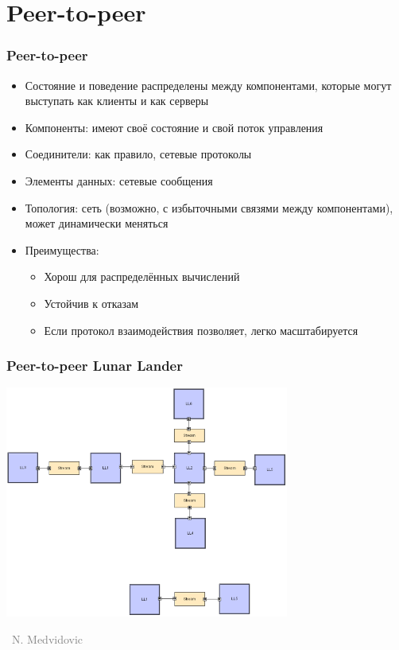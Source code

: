 \documentclass[xetex,mathserif,serif]{beamer}
\newcommand{\attribution}[1] {
	\vspace{-5mm}\begin{flushright}\begin{scriptsize}\textcolor{gray}{\textcopyright\, #1}\end{scriptsize}\end{flushright}
}
\begin{document}
	\section{Peer-to-peer}

	\begin{frame}
		\frametitle{Peer-to-peer}
		\begin{itemize}
			\item Состояние и поведение распределены между компонентами, которые могут выступать как клиенты и как серверы
			\item Компоненты: имеют своё состояние и свой поток управления
			\item Соединители: как правило, сетевые протоколы
			\item Элементы данных: сетевые сообщения
			\item Топология: сеть (возможно, с избыточными связями между компонентами), может динамически меняться
			\item Преимущества:
			\begin{itemize}
				\item Хорош для распределённых вычислений
				\item Устойчив к отказам
				\item Если протокол взаимодействия позволяет, легко масштабируется
			\end{itemize}
		\end{itemize}
	\end{frame}

	\begin{frame}
		\frametitle{Peer-to-peer Lunar Lander}
		\begin{center}
			\includegraphics[width=0.7\textwidth]{peerToPeerLL.png}
			\attribution{N. Medvidovic}
		\end{center}
	\end{frame}
\end{document}
